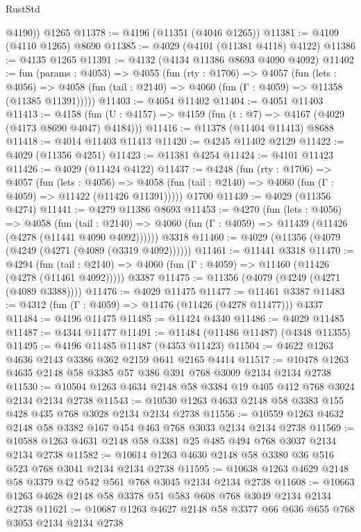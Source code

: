 \begin{lexlean}{RustStd}
\begin{coremodule}
        @4190))
    @1265
@11378 := @4196 (@11351 (@4046 @1265))
@11381 := @4109 (@4110 @1265) @8690
@11385 := @4029 (@4101 (@11381 @4118) @4122)
@11386 := @4135 @1265
@11391 := @4132 (@4134 @11386 @8693 @4090 @4092)
@11402 := fun (params : @4053) =>
  @4055
    (fun (rty : @1706) =>
    @4057
      (fun (lets : @4056) =>
      @4058 (fun (tail : @2140) => @4060 (fun (Γ : @4059) => @11358 (@11385 @11391)))))
@11403 := @4054 @11402
@11404 := @4051 @11403
@11413 := @4158 (fun (U : @4157) => @4159 (fun (t : @7) => @4167 (@4029 (@4173 @8690 @4047) @4184)))
@11416 := @11378 (@11404 @11413) @8688
@11418 := @4014 @11403 @11413
@11420 := @4245 @11402 @2129
@11422 := @4029 (@11356 @4251)
@11423 := @11381 @4254
@11424 := @4101 @11423
@11426 := @4029 (@11424 @4122)
@11437 := @4248
    (fun (rty : @1706) =>
    @4057
      (fun (lets : @4056) =>
      @4058 (fun (tail : @2140) => @4060 (fun (Γ : @4059) => @11422 (@11426 @11391)))))
    @1700
@11439 := @4029 (@11356 @4274)
@11441 := @4279 @11386 @8693
@11453 := @4270
    (fun (lets : @4056) =>
    @4058
      (fun (tail : @2140) =>
      @4060 (fun (Γ : @4059) => @11439 (@11426 (@4278 (@11441 @4090 @4092))))))
    @3318
@11460 := @4029 (@11356 (@4079 (@4249 (@4271 (@4089 (@3319 @4092))))))
@11461 := @11441 @3318
@11470 := @4294
    (fun (tail : @2140) => @4060 (fun (Γ : @4059) => @11460 (@11426 (@4278 (@11461 @4092)))))
    @3387
@11475 := @11356 (@4079 (@4249 (@4271 (@4089 @3388))))
@11476 := @4029 @11475
@11477 := @11461 @3387
@11483 := @4312 (fun (Γ : @4059) => @11476 (@11426 (@4278 @11477))) @4337
@11484 := @4196 @11475
@11485 := @11424 @4340
@11486 := @4029 @11485
@11487 := @4344 @11477
@11491 := @11484 (@11486 @11487) (@4348 @11355)
@11495 := @4196 @11485 @11487 (@4353 @11423)
@11504 := @4622 @1263 @4636 @2143 @3386 @362 @2159 @641 @2165 @4414
@11517 := @10478 @1263 @4635 @2148 @58 @3385 @57 @386 @391 @768 @3009 @2134 @2134 @2738
@11530 := @10504 @1263 @4634 @2148 @58 @3384 @19 @405 @412 @768 @3024 @2134 @2134 @2738
@11543 := @10530 @1263 @4633 @2148 @58 @3383 @155 @428 @435 @768 @3028 @2134 @2134 @2738
@11556 := @10559 @1263 @4632 @2148 @58 @3382 @167 @454 @463 @768 @3033 @2134 @2134 @2738
@11569 := @10588 @1263 @4631 @2148 @58 @3381 @25 @485 @494 @768 @3037 @2134 @2134 @2738
@11582 := @10614 @1263 @4630 @2148 @58 @3380 @36 @516 @523 @768 @3041 @2134 @2134 @2738
@11595 := @10638 @1263 @4629 @2148 @58 @3379 @42 @542 @561 @768 @3045 @2134 @2134 @2738
@11608 := @10663 @1263 @4628 @2148 @58 @3378 @51 @583 @608 @768 @3049 @2134 @2134 @2738
@11621 := @10687 @1263 @4627 @2148 @58 @3377 @66 @636 @655 @768 @3053 @2134 @2134 @2738

\end{coremodule}
\end{lexlean}
